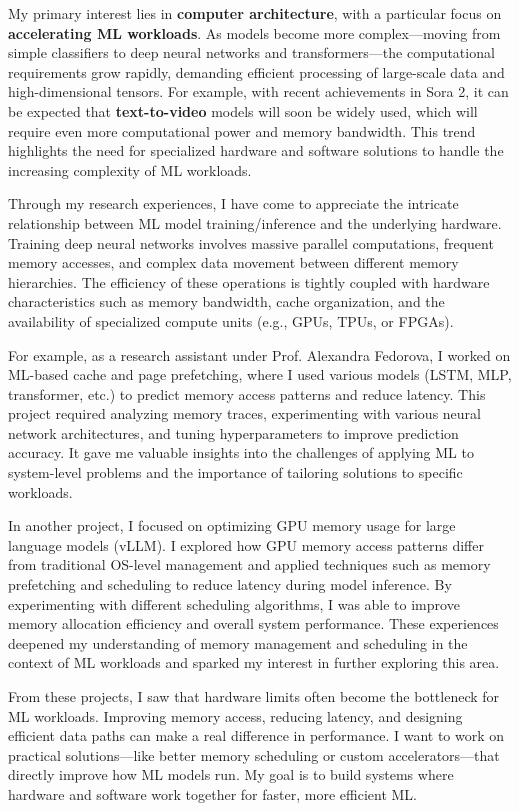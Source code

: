 \documentclass[a4 paper, 10pt]{article}
\begin{document}
My primary interest lies in \textbf{computer architecture}, with a particular focus on \textbf{accelerating ML workloads}. As models become more complex—moving from simple classifiers to deep neural networks and transformers—the computational requirements grow rapidly, demanding efficient processing of large-scale data and high-dimensional tensors. For example, with recent achievements in Sora 2, it can be expected that \textbf{text-to-video} models will soon be widely used, which will require even more computational power and memory bandwidth. This trend highlights the need for specialized hardware and software solutions to handle the increasing complexity of ML workloads.

Through my research experiences, I have come to appreciate the intricate relationship between ML model training/inference and the underlying hardware. Training deep neural networks involves massive parallel computations, frequent memory accesses, and complex data movement between different memory hierarchies. The efficiency of these operations is tightly coupled with hardware characteristics such as memory bandwidth, cache organization, and the availability of specialized compute units (e.g., GPUs, TPUs, or FPGAs).

For example, as a research assistant under Prof. Alexandra Fedorova, I worked on ML-based cache and page prefetching, where I used various models (LSTM, MLP, transformer, etc.) to predict memory access patterns and reduce latency. This project required analyzing memory traces, experimenting with various neural network architectures, and tuning hyperparameters to improve prediction accuracy. It gave me valuable insights into the challenges of applying ML to system-level problems and the importance of tailoring solutions to specific workloads.

In another project, I focused on optimizing GPU memory usage for large language models (vLLM). I explored how GPU memory access patterns differ from traditional OS-level management and applied techniques such as memory prefetching and scheduling to reduce latency during model inference. By experimenting with different scheduling algorithms, I was able to improve memory allocation efficiency and overall system performance. These experiences deepened my understanding of memory management and scheduling in the context of ML workloads and sparked my interest in further exploring this area.

From these projects, I saw that hardware limits often become the bottleneck for ML workloads. Improving memory access, reducing latency, and designing efficient data paths can make a real difference in performance. I want to work on practical solutions—like better memory scheduling or custom accelerators—that directly improve how ML models run. My goal is to build systems where hardware and software work together for faster, more efficient ML.
\end{document}
